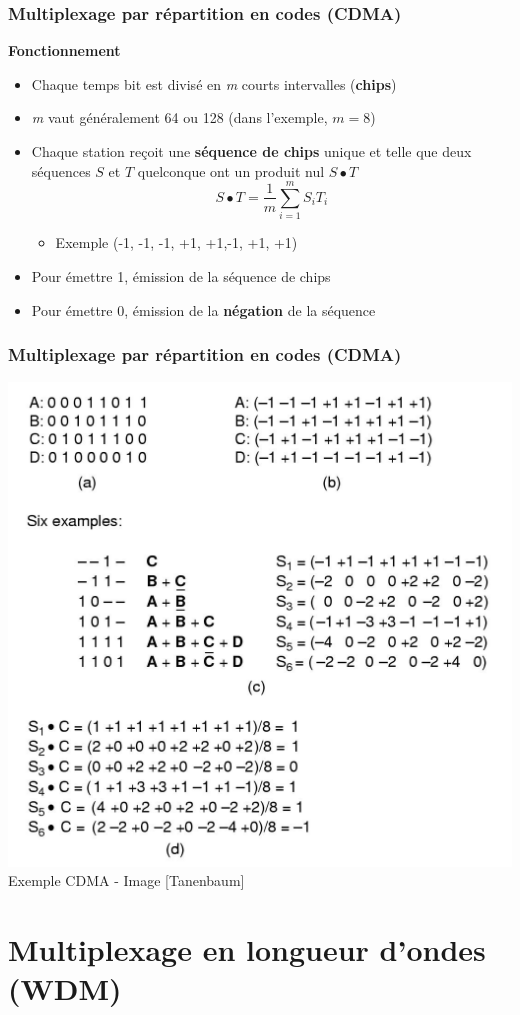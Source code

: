 \begin{frame}[fragile]
  \frametitle{Multiplexage par répartition en codes (CDMA)}
\textbf{Fonctionnement}
\begin{itemize}
	\item Chaque temps bit est divisé en \textit{m} courts intervalles
	(\textbf{chips})
	\item \textit{m} vaut généralement 64 ou 128 (dans l'exemple, $m=8$)
	\item Chaque station reçoit une \textbf{séquence de chips} unique et telle
	que deux séquences $S$ et $T$ quelconque ont un produit nul $S\bullet T$
	$$S\bullet T = \frac{1}{m}\sum^m_{i=1}S_iT_i$$
	\begin{itemize}
		\item Exemple (-1, -1, -1, +1, +1,-1, +1, +1)
	\end{itemize}
	\item Pour émettre 1, émission de la séquence de chips
	\item Pour émettre 0, émission de la \textbf{négation} de la séquence
\end{itemize}
\end{frame}

\begin{frame}[fragile]
  \frametitle{Multiplexage par répartition en codes (CDMA)}
\begin{center}
	\item \includegraphics[width=.56\linewidth]{img/4-16.jpg}\\
	{\scriptsize Exemple CDMA - Image [Tanenbaum]}
\end{center}
\end{frame}

\section{Multiplexage en longueur d'ondes (WDM)}

